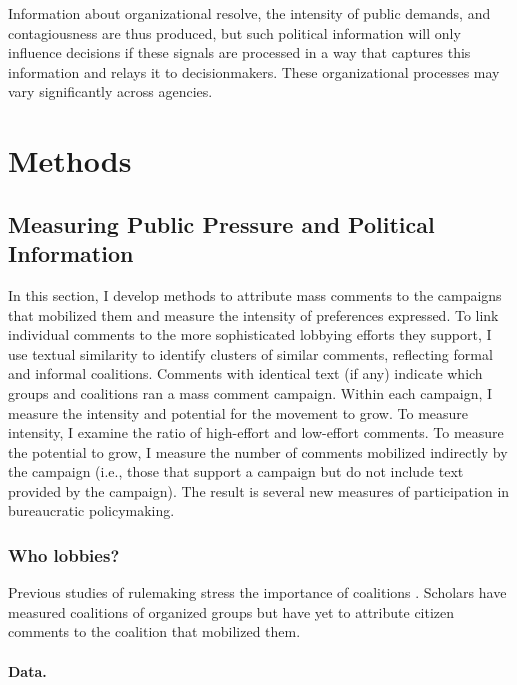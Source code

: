 \documentclass[
      12pt,
        ]{article}
\begin{document}
Information about organizational resolve, the intensity of public
demands, and contagiousness are thus produced, but such political
information will only influence decisions if these signals are processed
in a way that captures this information and relays it to decisionmakers.
These organizational processes may vary significantly across agencies.

\hypertarget{whyMail-methods}{%
\section{Methods}\label{whyMail-methods}}

\hypertarget{measuring-public-pressure-and-political-information}{%
\subsection{Measuring Public Pressure and Political Information}\label{measuring-public-pressure-and-political-information}}

In this section, I develop methods to attribute mass comments to the
campaigns that mobilized them and measure the intensity of preferences
expressed. To link individual comments to the more sophisticated
lobbying efforts they support, I use textual similarity to identify
clusters of similar comments, reflecting formal and informal coalitions.
Comments with identical text (if any) indicate which groups and
coalitions ran a mass comment campaign. Within each campaign, I measure
the intensity and potential for the movement to grow. To measure
intensity, I examine the ratio of high-effort and low-effort comments.
To measure the potential to grow, I measure the number of comments mobilized
indirectly by the campaign (i.e., those that support a campaign but do
not include text provided by the campaign). The result is several new
measures of participation in bureaucratic policymaking.

\hypertarget{who-lobbies}{%
\subsubsection{Who lobbies?}\label{who-lobbies}}

Previous studies of rulemaking stress the importance of coalitions
\citep{Yackee2006JOP}. Scholars have measured coalitions of organized groups
but have yet to attribute citizen comments to the coalition that
mobilized them.

\hypertarget{data.}{%
\paragraph{Data.}\label{data.}}
\end{document}
